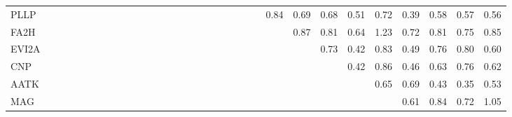 \begin{longtable}{lrrrrrrrrrrrrrrrrrrrrrrrrrrrrrrr}
PLLP    &             &             &             &          &              &              &            &            &               &              &           &             &             &             &              &             &               &              &             &               &            &            &       0.84 &        0.69 &      0.68 &       0.51 &      0.72 &       0.39 &       0.58 &       0.57 &       0.56 \\
FA2H    &             &             &             &          &              &              &            &            &               &              &           &             &             &             &              &             &               &              &             &               &            &            &            &        0.87 &      0.81 &       0.64 &      1.23 &       0.72 &       0.81 &       0.75 &       0.85 \\
EVI2A   &             &             &             &          &              &              &            &            &               &              &           &             &             &             &              &             &               &              &             &               &            &            &            &             &      0.73 &       0.42 &      0.83 &       0.49 &       0.76 &       0.80 &       0.60 \\
CNP     &             &             &             &          &              &              &            &            &               &              &           &             &             &             &              &             &               &              &             &               &            &            &            &             &           &       0.42 &      0.86 &       0.46 &       0.63 &       0.76 &       0.62 \\
AATK    &             &             &             &          &              &              &            &            &               &              &           &             &             &             &              &             &               &              &             &               &            &            &            &             &           &            &      0.65 &       0.69 &       0.43 &       0.35 &       0.53 \\
MAG     &             &             &             &          &              &              &            &            &               &              &           &             &             &             &              &             &               &              &             &               &            &            &            &             &           &            &           &       0.61 &       0.84 &       0.72 &       1.05 \\

\end{longtable}
